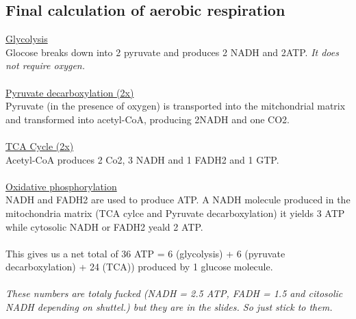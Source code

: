 \documentclass[../main.tex]{subfiles}
\begin{document}
\subsection{Final calculation of aerobic respiration }
\noindent
\underline{Glycolysis}\\
Glocose breaks down into 2 pyruvate and produces 2 NADH and 2ATP. \textit{It does not require oxygen.} \\
\\
\underline{Pyruvate decarboxylation (2x)}\\
Pyruvate (in the presence of oxygen) is transported into the mitchondrial matrix and transformed into acetyl-CoA, producing 2NADH and one CO2.\\
\\
\underline{TCA Cycle (2x)}\\
Acetyl-CoA produces 2 Co2, 3 NADH and 1 FADH2 and 1 GTP.\\
\\
\underline{Oxidative phosphorylation}\\
NADH and FADH2 are used to produce ATP. A NADH molecule produced in the mitochondria matrix (TCA cylce and Pyruvate decarboxylation) it yields 3 ATP while cytosolic NADH or FADH2 yeald 2 ATP. \\
\\
This gives us a net total of 36 ATP = 6 (glycolysis) + 6 (pyruvate decarboxylation) + 24 (TCA)) produced by 1 glucose molecule. \\
\\
\textit{These numbers are totaly fucked (NADH = 2.5 ATP, FADH = 1.5 and citosolic NADH depending on shuttel.) but they are in the slides. So just stick to them. }
\end{document}
